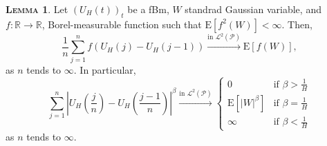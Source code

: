 \documentclass[a4paper, twoside, 11pt]{article}
\theoremstyle{definition}
\newtheorem{lemma}[definition]{\scshape Lemma}
\begin{document}
\begin{lemma}
  Let $(U_H(t))_{t}$ be a fBm, $W$ standrad Gaussian variable, and $f: \mathbb{R}\rightarrow \mathbb{R}$, Borel-measurable function such that $\mathrm{E}[f^2(W)] < \infty$. Then, 
  \begin{equation*}
	\frac{1}{n}\sum\limits_{j=1}^n f(U_H(j)-U_H(j-1)) \overset{\text{in }\mathcal{L}^2(\mathcal{P})}{\rightarrow} \mathrm{E}[f(W)],
  \end{equation*}
  as $n$ tends to $\infty$. In particular,
  \begin{equation}
	\sum_{j=1}^n |U_H(\frac{j}{n}) - U_H(\frac{j-1}{n})|^\beta \overset{\text{in }\mathcal{L}^2(\mathcal{P})}{\rightarrow} \begin{cases}
	  0 &\mbox{if } \beta > \frac{1}{H}\\
	  \mathrm{E}[|W|^\beta] &\mbox{if } \beta = \frac{1}{H}\\
	  \infty &\mbox{if } \beta < \frac{1}{H}
	\end{cases}
	\label{sec:semilemma}
  \end{equation}
  as $n$ tends to $\infty$.
\end{lemma}
\end{document}
